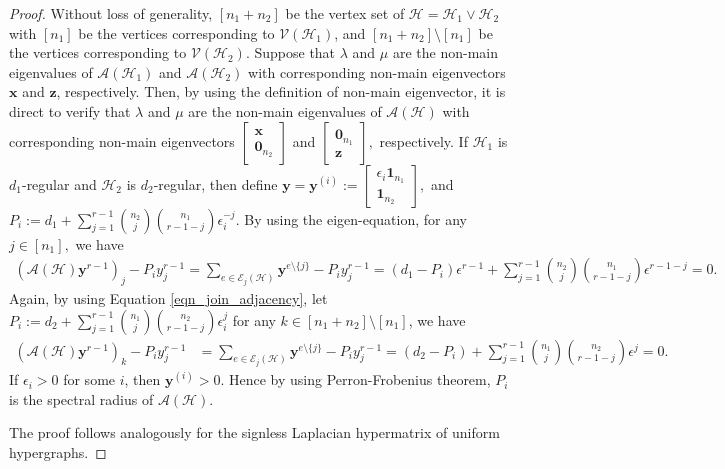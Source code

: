 \documentclass[10pt,a4paper]{article}
\begin{document}
	\begin{proof}
		Without loss of generality, $[n_1+n_2]$ be the vertex set of $\mathcal{H}=\mathcal{H}_1 \vee \mathcal{H}_2$ with
		$[n_1]$ be the vertices corresponding to $\mathcal{V}(\mathcal{H}_1)$, and $[n_1+n_2] \setminus [n_1]$ be the vertices corresponding to $\mathcal{V}(\mathcal{H}_2)$.
		Suppose that $\lambda$ and $\mu$ are the non-main eigenvalues of $\mathcal{A}(\mathcal{H}_1)$ and $\mathcal{A}(\mathcal{H}_2)$ with corresponding non-main eigenvectors $\mathbf{x}$ and $\mathbf{z}$, respectively. Then, by using the definition of non-main eigenvector, it is direct to verify that $\lambda$ and $\mu$ are the non-main eigenvalues of $\mathcal{A}(\mathcal{H})$ with corresponding non-main eigenvectors $ \left[ \begin{matrix}
			\mathbf{x}\\
			\mathbf{0}_{n_2} 
		\end{matrix} \right]$ and $ \left[ \begin{matrix}
			\mathbf{0}_{n_1}\\
			\mathbf{z} 
		\end{matrix} \right],$ respectively.
		If $\mathcal{H}_1$ is $d_1$-regular and $\mathcal{H}_2$ is $d_2$-regular, then define $ \mathbf{y}=\mathbf{y}^{(i)} := \left[ \begin{matrix}
			\epsilon_i \mathbf{1}_{n_1} \\
			\mathbf{1}_{n_2}
		\end{matrix} \right], $ and $P_i := d_1+ \sum\limits_{j=1}^{r-1} \binom{n_2}{j} \binom{n_1}{r-1-j} \epsilon_i^{-j}$. By using the eigen-equation, for any $j \in [n_1],$ we have
		\begin{align*}
			(\mathcal{A}(\mathcal{H}) \mathbf{y}^{r-1})_j - P_i y_j^{r-1} = \sum\limits_{e \in \mathcal{E}_j(\mathcal{H})} \mathbf{y}^{e\setminus \{ j\} } - P_i y_j^{r-1} = (d_1 -P_i) \epsilon^{r-1} + \sum\limits_{j=1}^{r-1} \binom{n_2}{j} \binom{n_1}{r-1-j} \epsilon^{r-1-j} =0.
		\end{align*}
		Again, by using Equation \ref{eqn_join_adjacency}, let $P_i:= d_2+ \sum\limits_{j=1}^{r-1} \binom{n_1}{j}\binom{n_2}{r-1-j} \epsilon_i^{j} $ for any $k \in [n_1+n_2] \setminus [n_1]$, we have 
		\begin{align*}
			(\mathcal{A}(\mathcal{H}) \mathbf{y}^{r-1})_k -  P_i y_j^{r-1} &= \sum\limits_{e \in \mathcal{E}_j(\mathcal{H})} \mathbf{y}^{e\setminus \{ j\} } - P_i y_j^{r-1} = (d_2 -P_i)  + \sum\limits_{j=1}^{r-1} \binom{n_1}{j} \binom{n_2}{r-1-j} \epsilon^{j} =0.
		\end{align*}
		If $\epsilon_i > 0$ for some $i$, then $\mathbf{y}^{(i)} >0$. Hence by using Perron-Frobenius theorem, $P_i$ is the spectral radius of $\mathcal{A}(\mathcal{H})$. 
		
		\noindent  The proof follows analogously for the signless Laplacian hypermatrix of uniform hypergraphs.
	\end{proof}
	
\end{document}
